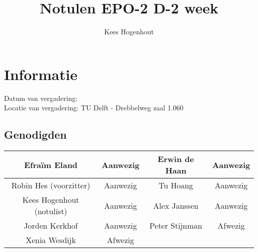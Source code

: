 \documentclass{article}
\begin{document}
\title{Notulen EPO-2 D-2 week }%
\author{Kees Hogenhout}%
\maketitle

\section*{Informatie}
Datum van vergadering: \\ %
Locatie van vergadering: TU Delft - Drebbelweg zaal 1.060 %
\subsection*{Genodigden}
\begin{center}
\begin{tabular}{|c |c | c| c|}
	\hline
Efraïm Eland  & Aanwezig & Erwin de Haan & Aanwezig \\
	\hline
Robin Hes (voorzitter) & Aanwezig & Tu Hoang & Aanwezig \\
	\hline
Kees Hogenhout (notulist) & Aanwezig & Alex Janssen & Aanwezig\\
	\hline
Jorden Kerkhof & Aanwezig & Peter Stijnman & Afwezig \\
	\hline
Xenia Wesdijk & Afwezig & & \\
	\hline
\end{tabular}
\end{center}
\end{document}
